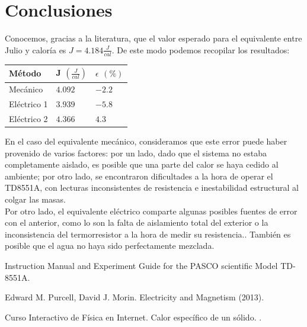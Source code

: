 \documentclass{article}
\begin{document}
\section{Conclusiones}
Conocemos, gracias a la literatura\cite{pasco}, que el valor esperado para el equivalente entre Julio y caloría es $J = 4.184 \frac{J}{cal}$. De este modo podemos recopilar los resultados:

\begin{table}[H]
\centering
\begin{tabular}{l|l|l}
Método      & J $\left ( \frac{J}{cal} \right )$ & $\epsilon$ $(\%)$ \\
\hline
Mecánico    & $4.092$ & $-2.2$ \\
Eléctrico 1 & $3.939$ & $-5.8$ \\
Eléctrico 2 & $4.366$ & $4.3$ \\
\end{tabular}
\end{table}

En el caso del equivalente mecánico, consideramos que este error puede haber provenido de varios factores: por un lado, dado que el sistema no estaba completamente aislado, es posible que una parte del calor se haya cedido al ambiente; por otro lado, se encontraron dificultades a la hora de operar el TD8551A, con lecturas inconsistentes de resistencia e inestabilidad estructural al colgar las masas.\\

Por otro lado, el equivalente eléctrico comparte algunas posibles fuentes de error con el anterior, como lo son la falta de aislamiento total del exterior o la inconsistencia del termorresistor a la hora de medir su resistencia.. También es posible que el agua no haya sido perfectamente mezclada.


\begin{thebibliography}{X}

 Instruction Manual and Experiment Guide for the PASCO scientific Model TD-8551A. 

 Edward M. Purcell, David J. Morin. Electricity and Magnetism (2013).

 Curso Interactivo de Física en Internet. Calor específico de un sólido. . 

\end{thebibliography}
\end{document}
